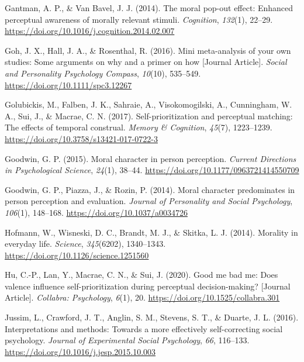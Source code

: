 \documentclass[
  man]{apa6}
\newlength{\cslhangindent}
\newlength{\cslentryspacingunit} %
\newenvironment{CSLReferences}[2] %
 {%
  \setlength{\parindent}{0pt}
  \ifodd #1
  \let\oldpar\par
  \def\par{\hangindent=\cslhangindent\oldpar}
  \fi
  \setlength{\parskip}{#2\cslentryspacingunit}
 }%
 {}
\begin{document}
\begin{CSLReferences}{1}{0}
\leavevmode{}%
Gantman, A. P., \& Van Bavel, J. J. (2014). The moral pop-out effect: Enhanced perceptual awareness of morally relevant stimuli. \emph{Cognition}, \emph{132}(1), 22--29. \url{https://doi.org/10.1016/j.cognition.2014.02.007}

\leavevmode{}%
Goh, J. X., Hall, J. A., \& Rosenthal, R. (2016). Mini meta-analysis of your own studies: Some arguments on why and a primer on how {[}Journal Article{]}. \emph{Social and Personality Psychology Compass}, \emph{10}(10), 535--549. \url{https://doi.org/10.1111/spc3.12267}

\leavevmode{}%
Golubickis, M., Falben, J. K., Sahraie, A., Visokomogilski, A., Cunningham, W. A., Sui, J., \& Macrae, C. N. (2017). Self-prioritization and perceptual matching: The effects of temporal construal. \emph{Memory \& Cognition}, \emph{45}(7), 1223--1239. \url{https://doi.org/10.3758/s13421-017-0722-3}

\leavevmode{}%
Goodwin, G. P. (2015). Moral character in person perception. \emph{Current Directions in Psychological Science}, \emph{24}(1), 38--44. \url{https://doi.org/10.1177/0963721414550709}

\leavevmode{}%
Goodwin, G. P., Piazza, J., \& Rozin, P. (2014). Moral character predominates in person perception and evaluation. \emph{Journal of Personality and Social Psychology}, \emph{106}(1), 148--168. \url{https://doi.org/10.1037/a0034726}

\leavevmode{}%
Hofmann, W., Wisneski, D. C., Brandt, M. J., \& Skitka, L. J. (2014). Morality in everyday life. \emph{Science}, \emph{345}(6202), 1340--1343. \url{https://doi.org/10.1126/science.1251560}

\leavevmode{}%
Hu, C.-P., Lan, Y., Macrae, C. N., \& Sui, J. (2020). Good me bad me: Does valence influence self-prioritization during perceptual decision-making? {[}Journal Article{]}. \emph{Collabra: Psychology}, \emph{6}(1), 20. \url{https://doi.org/10.1525/collabra.301}

\leavevmode{}%
Jussim, L., Crawford, J. T., Anglin, S. M., Stevens, S. T., \& Duarte, J. L. (2016). Interpretations and methods: {Towards} a more effectively self-correcting social psychology. \emph{Journal of Experimental Social Psychology}, \emph{66}, 116--133. \url{https://doi.org/10.1016/j.jesp.2015.10.003}


\end{CSLReferences}
\end{document}
